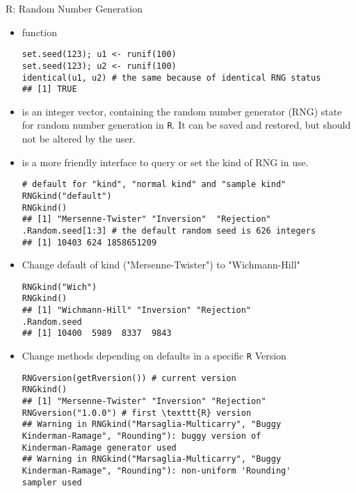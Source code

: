\documentclass[11pt,compress,t,notes=noshow, xcolor=table]{beamer}
\begin{document}
\begin{vbframe}{R: Random Number Generation}
\begin{itemize}
\item {} function

\footnotesize
\begin{verbatim}
set.seed(123); u1 <- runif(100)
set.seed(123); u2 <- runif(100) 
identical(u1, u2) # the same because of identical RNG status
## [1] TRUE
\end{verbatim}


\normalsize
\item {} is an integer vector, containing the random number generator (RNG) state for random number generation in \texttt{R}. It can be saved and restored, but should not be altered by the user.

\item {} is a more friendly interface to query or set the kind of RNG in use.
\footnotesize

\begin{verbatim}
# default for "kind", "normal kind" and "sample kind" 
RNGkind("default") 
RNGkind()
## [1] "Mersenne-Twister" "Inversion"  "Rejection"
.Random.seed[1:3] # the default random seed is 626 integers
## [1] 10403 624 1858651209
\end{verbatim}


\normalsize
\framebreak
\item Change default of kind ("Mersenne-Twister") to "Wichmann-Hill"

\footnotesize
\begin{verbatim}
RNGkind("Wich")
RNGkind()
## [1] "Wichmann-Hill" "Inversion" "Rejection"
.Random.seed
## [1] 10400  5989  8337  9843
\end{verbatim}


\normalsize
\item Change methods depending on defaults in a specific \texttt{R} Version

\footnotesize
\begin{verbatim}
RNGversion(getRversion()) # current version
RNGkind()
## [1] "Mersenne-Twister" "Inversion" "Rejection"
RNGversion("1.0.0") # first \texttt{R} version
## Warning in RNGkind("Marsaglia-Multicarry", "Buggy
Kinderman-Ramage", "Rounding"): buggy version of 
Kinderman-Ramage generator used
## Warning in RNGkind("Marsaglia-Multicarry", "Buggy
Kinderman-Ramage", "Rounding"): non-uniform 'Rounding' 
sampler used
\end{verbatim}


\end{itemize}
\end{vbframe}
\end{document}

